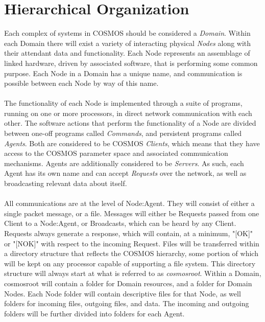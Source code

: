 \documentclass[10pt,letterpaper]{report}
\begin{document}
\chapter{Hierarchical Organization}
Each complex of systems in COSMOS should be considered a \emph{Domain}. Within each Domain there will exist a variety of interacting physical \emph{Nodes} along with their attendant data and functionality. Each Node represents an assemblage of linked hardware, driven by associated software, that is performing some common purpose. Each Node in a Domain has a unique name, and communication is possible between each Node by way of this name.
\\
\\
The functionality of each Node is implemented through a suite of programs, running on one or more processors, in direct network communication with each other. The software actions that perform the functionality of a Node are divided  between one-off programs called \emph{Commands}, and persistent programs called \emph{Agents}. Both are considered to be COSMOS \emph{Clients}, which means that they have access to the COSMOS parameter space and associated communication mechanisms. Agents are additionally considered to be \emph{Servers}. As such, each Agent has its own name and can accept \emph{Requests} over the network, as well as broadcasting relevant data about itself.
\\
\\
All communications are at the level of Node:Agent. They will consist of either a single packet message, or a file. Messages will either be Requests  passed from one Client to a Node:Agent, or Broadcasts, which can be heard by any Client. Requests always generate a response, which will contain, at a minimum,  "[OK]" or "[NOK]" with respect to the incoming Request. Files will be transferred within  a directory structure that reflects the COSMOS hierarchy, some portion of which will be kept on any processor capable of supporting a file system. This directory structure will always start at what is referred to as \emph{cosmosroot}. Within a Domain, cosmosroot will contain a folder for Domain resources, and a folder for Domain Nodes. Each Node folder will contain descriptive files for that Node, as well folders for incoming files, outgoing files, and data. The incoming and outgoing folders will be further divided into folders for each Agent.
\end{document}
